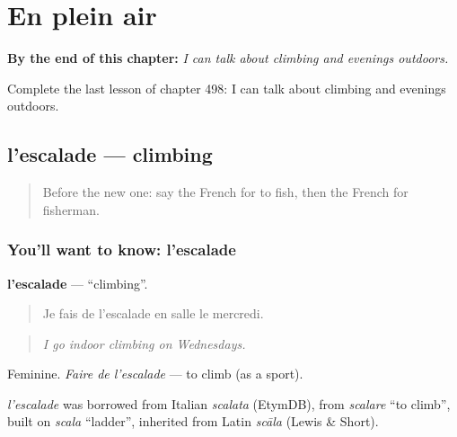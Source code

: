 
\chapter{En plein air}
\label{ch:fr-en-plein-air}

\begin{chapteropening}
\textbf{By the end of this chapter:} \emph{I can talk about climbing and evenings outdoors.}

Complete the last lesson of chapter 498: I can talk about climbing and evenings outdoors.
\end{chapteropening}

\section[l'escalade]{l'escalade — climbing}

\label{lesson:FR-C498-escalade}



\begin{quote}
Before the new one: say the French for to fish, then the French for fisherman.
\end{quote}

\subsection*{You'll want to know: l'escalade}
\textbf{l'escalade} — \textquotedblleft{}climbing\textquotedblright{}.

\begin{quote}
Je fais de l'escalade en salle le mercredi.
\end{quote}

\begin{quote}
\emph{I go indoor climbing on Wednesdays.}
\end{quote}

Feminine. \emph{Faire de l'escalade} — to climb (as a sport).

\begin{cousinweb}
\emph{l'escalade} was borrowed from Italian \emph{scalata} (EtymDB), from \emph{scalare} \textquotedblleft{}to climb\textquotedblright{}, built on \emph{scala} \textquotedblleft{}ladder\textquotedblright{}, inherited from Latin \emph{scāla} (Lewis \& Short).
\end{cousinweb}

